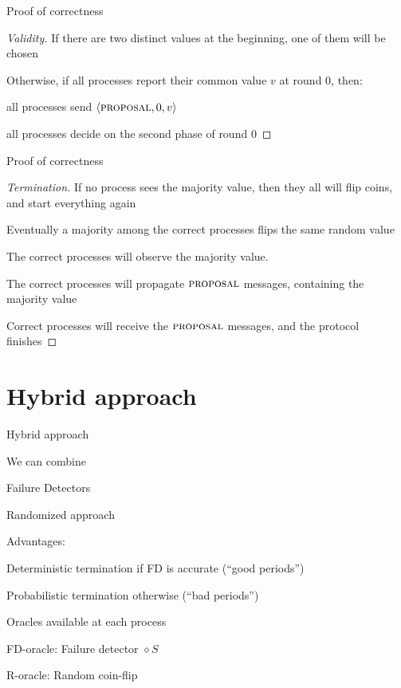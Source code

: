\begin{frame}{Proof of correctness}
\begin{proof}[Validity]
\BIL
\item If there are two distinct values at the beginning, one of them will be chosen
\item Otherwise, if all processes report their common value $v$ at round $0$, then:
\BI
  \item all processes send $\langle \textsc{proposal}, 0, v \rangle$
  \item all processes decide on the second phase of round $0$
\EI
\EIL
\end{proof}
\end{frame}

\begin{frame}{Proof of correctness}
	
\begin{proof}[Termination]
\BIL
\item If no process sees the majority value, then they all will flip coins, and start everything again
\item Eventually a majority among the correct processes flips the same random value
	\BI
	\item The correct processes will observe the majority value.
	\item The correct processes will propagate $\textsc{proposal}$ messages, containing the majority value
	\EI
\item Correct processes will receive the $\textsc{proposal}$ messages, and the protocol finishes
\EIL
\end{proof}

\end{frame}

\section{Hybrid approach}

\begin{frame}{Hybrid approach}
	
\BIL
\item We can combine
	\BI
	\item Failure Detectors
	\item Randomized approach
	\EI
\item Advantages:
	\BI
	\item Deterministic termination if FD is accurate (“good periods”)
	\item Probabilistic termination otherwise (“bad periods”)
	\EI
\item Oracles available at each process
	\BI
	\item FD-oracle: Failure detector $\diamond S$
	\item R-oracle: Random coin-flip
	\EI
\EIL	


\begin{Bib}
\BI
\item {}
\EI
\end{Bib}
	
\end{frame}




